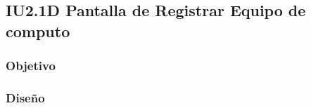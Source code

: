 \newpage
\subsection{IU2.1D Pantalla de Registrar Equipo de computo}

\subsubsection{Objetivo}

\subsubsection{Diseño}


